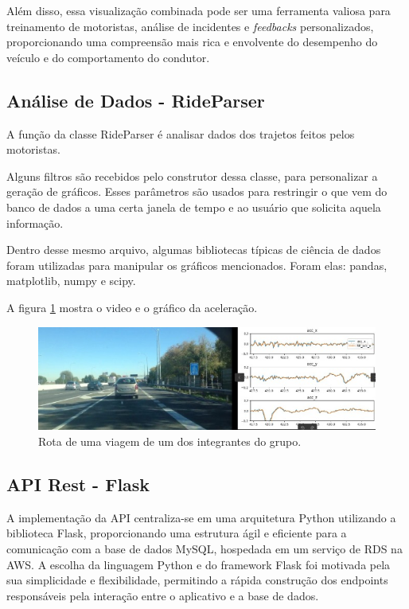     Além disso, essa visualização combinada pode ser uma ferramenta valiosa para treinamento de motoristas, análise de incidentes e \textit{feedbacks} personalizados, proporcionando uma compreensão mais rica e envolvente do desempenho do veículo e do comportamento do condutor.

    \subsection{Análise de Dados - RideParser}\label{rideparser}

    A função da classe RideParser é analisar dados dos trajetos feitos pelos motoristas. 
    
    Alguns filtros são recebidos pelo construtor dessa classe, para personalizar a geração de gráficos. Esses parâmetros são usados para restringir o que vem do banco de dados a uma certa janela de tempo e ao usuário que solicita aquela informação.
    
    Dentro desse mesmo arquivo, algumas bibliotecas típicas de ciência de dados foram utilizadas para manipular os gráficos mencionados. Foram elas: pandas, matplotlib, numpy e scipy.
    
    A figura \ref{fig:rota1integrante} mostra o video e o gráfico da aceleração.
    
    \begin{figure}[hp]
        \centering
        
        \includegraphics[scale=0.6]{figures/rota_integrante.jpg}
        
        \caption{Rota de uma viagem de um dos integrantes do grupo.}
        \label{fig:rota1integrante}
    \end{figure}

    \subsection{API Rest - Flask}
    A implementação da API centraliza-se em uma arquitetura Python utilizando a biblioteca Flask, proporcionando uma estrutura ágil e eficiente para a comunicação com a base de dados MySQL, hospedada em um serviço de RDS na AWS. A escolha da linguagem Python e do framework Flask foi motivada pela sua simplicidade e flexibilidade, permitindo a rápida construção dos endpoints responsáveis pela interação entre o aplicativo e a base de dados.

